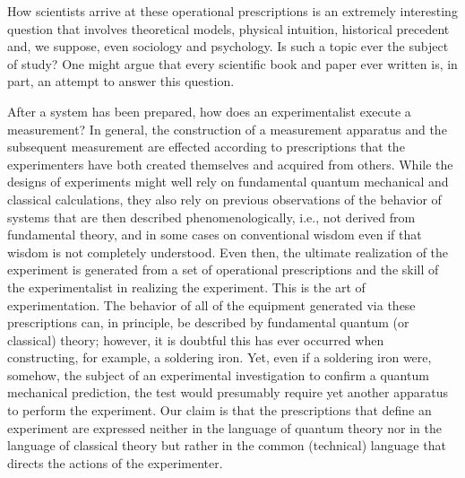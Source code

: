 \documentclass [12pt]{revtex4}
\begin{document}
How scientists arrive at these operational prescriptions is an
extremely interesting question that involves theoretical models,
physical intuition, historical precedent and, we suppose, even
sociology and psychology. Is such a topic ever the subject of study?
One might argue that every scientific book and paper ever written
is, in part, an attempt to answer this question.

After a system has been prepared, how does an experimentalist
execute a measurement? In general, the construction of a measurement
apparatus and the subsequent measurement are effected according to
prescriptions that the experimenters have both created themselves
and acquired from others. While the designs of experiments might
well rely on fundamental quantum mechanical and classical
calculations, they also rely on previous observations of the
behavior of systems that are then described phenomenologically,
i.e., not derived from fundamental theory, and in some cases on
conventional wisdom even if that wisdom is not completely
understood. Even then, the ultimate realization of the experiment is
generated from a set of operational prescriptions and the skill of
the experimentalist in realizing the experiment. This is the art of
experimentation. The behavior of all of the equipment generated via
these prescriptions can, in principle, be described by fundamental
quantum (or classical) theory; however, it is doubtful this has ever
occurred when constructing, for example, a soldering iron. Yet, even if
a soldering iron were, somehow, the subject of an experimental
investigation to confirm a quantum mechanical prediction, the test
would presumably require yet another apparatus to perform the
experiment. Our claim is that the prescriptions that define an
experiment are expressed neither in the language of quantum theory
nor in the language of classical theory but rather in the common
(technical) language that directs the actions of the experimenter. 
\end{document}
